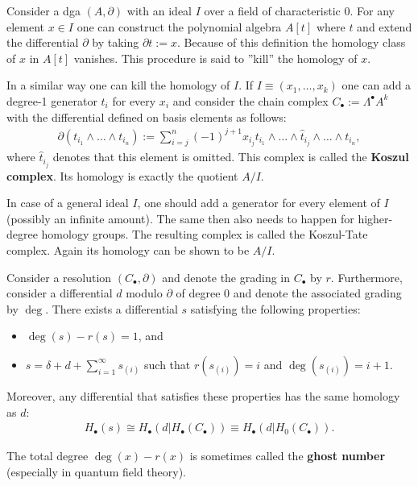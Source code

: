     \begin{example}\label{homalg:koszul_tate}
        Consider a dga $(A,\partial)$ with an ideal $I$ over a field of characteristic 0. For any element $x\in I$ one can construct the polynomial algebra $A[t]$ where $t$ and extend the differential $\partial$ by taking $\partial t := x$. Because of this definition the homology class of $x$ in $A[t]$ vanishes. This procedure is said to ''kill'' the homology of $x$.

        In a similar way one can kill the homology of $I$. If $I\equiv(x_1,\ldots,x_k)$ one can add a degree-1 generator $t_i$ for every $x_i$ and consider the chain complex $C_\bullet:=\Lambda^\bullet A^k$ with the differential defined on basis elements as follows:
        \begin{gather}
            \partial(t_{i_1}\wedge\ldots\wedge t_{i_n}) := \sum_{i=j}^n(-1)^{j+1}x_{i_j}t_{i_1}\wedge\ldots\wedge\widehat{t}_{i_j}\wedge\ldots\wedge t_{i_n},
        \end{gather}
        where $\widehat{t}_{i_j}$ denotes that this element is omitted. This complex is called the \textbf{Koszul complex}. Its homology is exactly the quotient $A/I$.

        In case of a general ideal $I$, one should add a generator for every element of $I$ (possibly an infinite amount). The same then also needs to happen for higher-degree homology groups. The resulting complex is called the Koszul-Tate complex. Again its homology can be shown to be $A/I$.
    \end{example}

    \begin{theorem}
        Consider a resolution $(C_\bullet,\partial)$ and denote the grading in $C_\bullet$ by $r$. Furthermore, consider a differential $d$ modulo $\partial$ of degree 0 and denote the associated grading by $\deg$. There exists a differential $s$ satisfying the following properties:
        \begin{itemize}
            \item $\deg(s) - r(s) = 1$, and
            \item $s = \delta + d + \sum_{i=1}^\infty s_{(i)}$ such that $r(s_{(i)})=i$ and $\deg(s_{(i)}) = i+1$.
        \end{itemize}
        Moreover, any differential that satisfies these properties has the same homology as $d$:
        \begin{gather}
            H_\bullet(s) \cong H_\bullet(d|H_\bullet(C_\bullet))\equiv H_\bullet(d|H_0(C_\bullet)).
        \end{gather}
    \end{theorem}
    \begin{remark}
        The total degree $\deg(x)-r(x)$ is sometimes called the \textbf{ghost number} (especially in quantum field theory).
    \end{remark}

